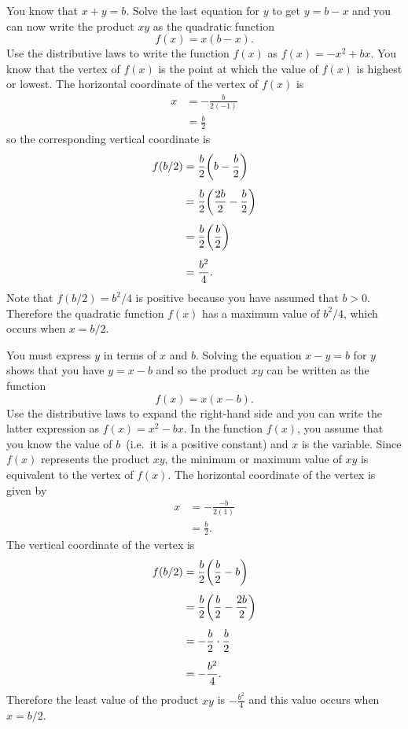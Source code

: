 \documentclass[a4paper,oneside,12pt]{article}
\begin{document}
\begin{problem}
{\begin{solution}
You know that $x + y = b$.  Solve the last equation for $y$ to get
$y = b - x$ and you can now write the product $xy$ as the quadratic
function
\[
f(x)
=
x(b - x).
\]
Use the distributive laws to write the function $f(x)$ as
$f(x) = -x^2 + bx$.  You know that the vertex of $f(x)$ is the point
at which the value of $f(x)$ is highest or lowest.  The horizontal
coordinate of the vertex of $f(x)$ is
\begin{align*}
x
&=
-\frac{b}{2(-1)} \\[4pt]
&=
\frac{b}{2}
\end{align*}
so the corresponding vertical coordinate is
\begin{align*}
f(b/2)
&=
\frac{b}{2} \parenthesis*{b - \frac{b}{2}} \\[4pt]
&=
\frac{b}{2} \parenthesis*{\frac{2b}{2} - \frac{b}{2}} \\[4pt]
&=
\frac{b}{2} \parenthesis*{\frac{b}{2}} \\[4pt]
&=
\frac{b^2}{4}.
\end{align*}
Note that $f(b/2) = b^2 / 4$ is positive because you have assumed that
$b > 0$.  Therefore the quadratic function $f(x)$ has a maximum value
of $b^2 / 4$, which occurs when $x = b / 2$.

You must express $y$ in terms of $x$ and $b$.  Solving the equation
$x - y = b$ for $y$ shows that you have $y = x - b$ and so the product
$xy$ can be written as the function
\[
f(x)
=
x(x - b).
\]
Use the distributive laws to expand the right-hand side and you can
write the latter expression as $f(x) = x^2 - bx$.  In the function
$f(x)$, you assume that you know the value of $b$~(i.e.~it is a
positive constant) and $x$ is the variable.  Since $f(x)$ represents
the product $xy$, the minimum or maximum value of $xy$ is equivalent
to the vertex of $f(x)$.  The horizontal coordinate of the vertex is
given by
\begin{align*}
x
&=
-\frac{-b}{2(1)} \\[4pt]
&=
\frac{b}{2}.
\end{align*}
The vertical coordinate of the vertex is
\begin{align*}
f(b/2)
&=
\frac{b}{2}
\parenthesis*{\frac{b}{2} - b} \\[4pt]
&=
\frac{b}{2}
\parenthesis*{\frac{b}{2} - \frac{2b}{2}} \\[4pt]
&=
-\frac{b}{2} \cdot \frac{b}{2} \\[4pt]
&=
-\frac{b^2}{4}.
\end{align*}
Therefore the least value of the product $xy$ is $-\frac{b^2}{4}$ and
this value occurs when $x = b/2$.
\end{solution}
}{}


\end{problem}
\end{document}
